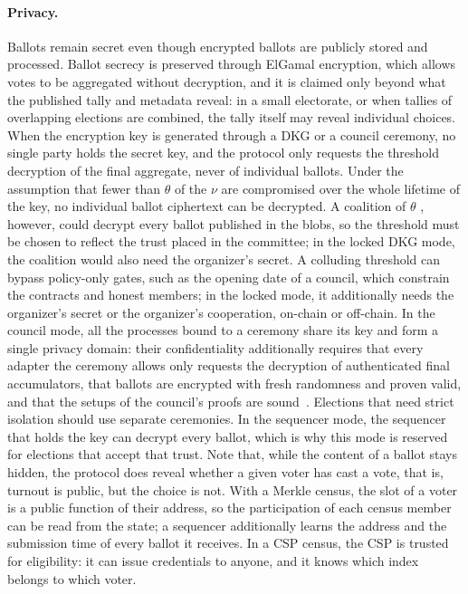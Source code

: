 \paragraph{Privacy.} Ballots remain secret even though encrypted ballots are publicly stored and processed. Ballot secrecy is preserved through ElGamal encryption, which allows votes to be aggregated without decryption, and it is claimed only beyond what the published tally and metadata reveal: in a small electorate, or when tallies of overlapping elections are combined, the tally itself may reveal individual choices. When the encryption key is generated through a \ac{DKG} or a council ceremony, no single party holds the secret key, and the protocol only requests the threshold decryption of the final aggregate, never of individual ballots. Under the assumption that fewer than $\theta$ of the $\nu$ \keywardens are compromised over the whole lifetime of the key, no individual ballot ciphertext can be decrypted. A coalition of $\theta$ \keywardens, however, could decrypt every ballot published in the blobs, so the threshold must be chosen to reflect the trust placed in the committee; in the locked \ac{DKG} mode, the coalition would also need the organizer's secret. A colluding threshold can bypass policy-only gates, such as the opening date of a council, which constrain the contracts and honest members; in the locked mode, it additionally needs the organizer's secret or the organizer's cooperation, on-chain or off-chain. In the council mode, all the processes bound to a ceremony share its key and form a single privacy domain: their confidentiality additionally requires that every adapter the ceremony allows only requests the decryption of authenticated final accumulators, that ballots are encrypted with fresh randomness and proven valid, and that the setups of the council's proofs are sound~\cite{davinci-council}. Elections that need strict isolation should use separate ceremonies. In the sequencer mode, the sequencer that holds the key can decrypt every ballot, which is why this mode is reserved for elections that accept that trust. Note that, while the content of a ballot stays hidden, the protocol does reveal whether a given voter has cast a vote, that is, turnout is public, but the choice is not. With a Merkle census, the slot of a voter is a public function of their address, so the participation of each census member can be read from the state; a sequencer additionally learns the address and the submission time of every ballot it receives. In a \ac{CSP} census, the \ac{CSP} is trusted for eligibility: it can issue credentials to anyone, and it knows which index belongs to which voter.

